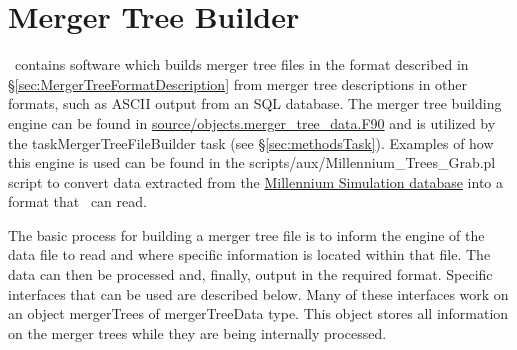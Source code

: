 \section{Merger Tree Builder}\label{sec:MergerTreeBuilder}

\glc\ contains software which builds merger tree files in the format described in \S\ref{sec:MergerTreeFormatDescription} from merger tree descriptions in other formats, such as ASCII output from an SQL database. The merger tree building engine can be found in \hyperlink{objects.merger_tree_data.F90}{{\normalfont \ttfamily source/objects.merger\_tree\_data.F90}} and is utilized by the {\normalfont \ttfamily taskMergerTreeFileBuilder} task (see \S\ref{sec:methodsTask}). Examples of how this engine is used can be found in the {\normalfont \ttfamily scripts/aux/Millennium\_Trees\_Grab.pl} script to convert data extracted from the \href{http://www.g-vo.org/MyMillennium3/}{Millennium Simulation database} into a format that \glc\ can read.

The basic process for building a merger tree file is to inform the engine of the data file to read and where specific information is located within that file. The data can then be processed and, finally, output in the required format. Specific interfaces that can be used are described below. Many of these interfaces work on an object {\normalfont \ttfamily mergerTrees} of {\normalfont \ttfamily mergerTreeData} type. This object stores all information on the merger trees while they are being internally processed.

